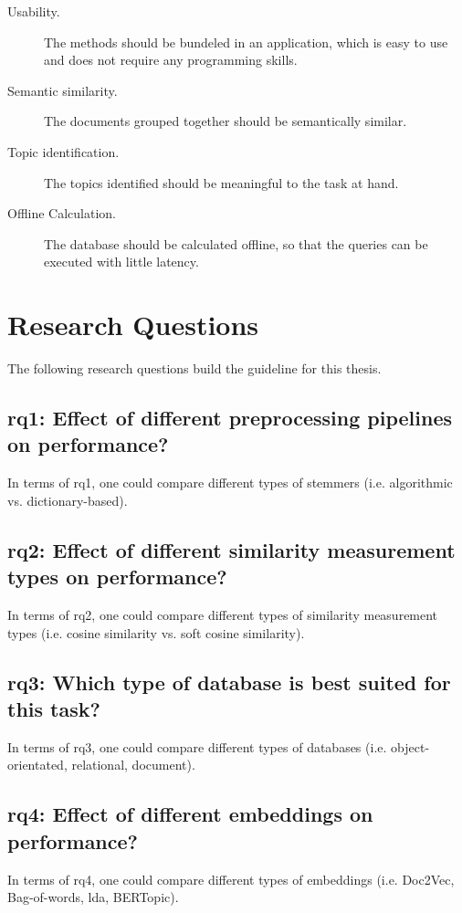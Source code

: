\begin{description}
    \item[Usability.]
    The methods should be bundeled in an application, which is easy to use and does not require any programming skills.
    \item[Semantic similarity.]
    The documents grouped together should be semantically similar.
    \item[Topic identification.]
    The topics identified should be meaningful to the task at hand.  
    \item[Offline Calculation.]
    The database should be calculated offline, so that the queries can be executed with little latency.
\end{description}


\section{Research Questions}\label{sec:research-questions}
The following research questions build the guideline for this thesis.

\subsection[\acs{rq}1]{\ac{rq}1: Effect of different preprocessing pipelines on performance?}\label{subsec:rq1}
In terms of \ac{rq}1, one could compare different types of stemmers (i.e. algorithmic vs. dictionary-based).

\subsection[\acs{rq}2]{\ac{rq}2: Effect of different similarity measurement types on performance?}\label{subsec:rq2}
In terms of \ac{rq}2, one could compare different types of similarity measurement types (i.e. cosine similarity vs. soft cosine similarity).

\subsection[\acs{rq}3]{\ac{rq}3: Which type of database is best suited for this task?}\label{subsec:rq3}
In terms of \ac{rq}3, one could compare different types of databases (i.e. object-orientated, relational, document).

\subsection[\acs{rq}4]{\ac{rq}4: Effect of different embeddings on performance?}\label{subsec:rq4}
In terms of \ac{rq}4, one could compare different types of embeddings (i.e. Doc2Vec, Bag-of-words, \ac{lda}, BERTopic).



